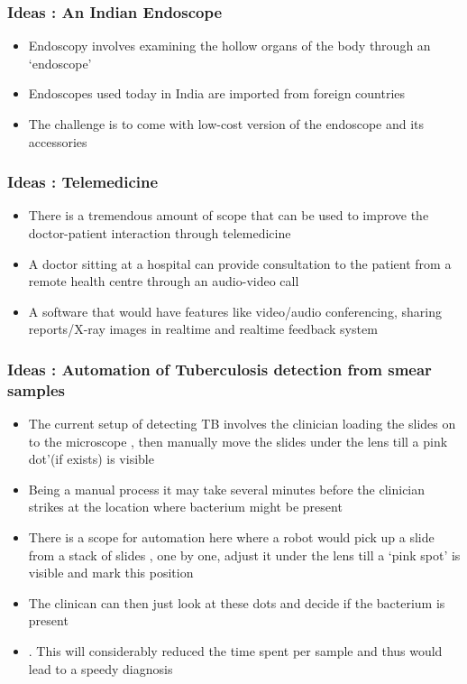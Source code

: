 \documentclass{beamer}
\begin{document}
\begin{frame}
\frametitle{Ideas : An  Indian Endoscope}
    \begin{itemize}
        \item  Endoscopy involves examining the hollow organs of the body through an ‘endoscope’
        \item  Endoscopes used today in India are imported from foreign countries
        \item  The challenge is to come with low-cost version of the endoscope and its accessories
    \end{itemize}
\end{frame}





\begin{frame}
\frametitle{Ideas : Telemedicine}
    \begin{itemize}
        \item  There is a tremendous amount of scope that can be used to improve the doctor-patient interaction through telemedicine
        \item  A doctor sitting at a hospital can provide consultation to the patient from a remote health centre through an audio-video call
        \item  A software that would have features like video/audio conferencing, sharing reports/X-ray images in realtime and realtime feedback system 
    \end{itemize}
\end{frame}



\begin{frame}
\frametitle{Ideas : Automation of Tuberculosis detection from smear samples}
    \begin{itemize}
        \item  The current setup of detecting TB involves the clinician loading the slides on to the microscope , then manually move the slides under the lens till a 
pink dot’(if exists) is visible
        \item   Being a manual process it may take several minutes before the clinician strikes at the location where bacterium might be present
        \item  There is a scope for automation here where a robot would pick up a slide from a stack of slides , one by one, adjust it under the lens till a ‘pink spot’ is visible and mark this position 
        \item The clinican can then just look at these dots and decide if the bacterium is present
        \item . This will considerably reduced the time spent per sample and thus would lead to a speedy diagnosis
    \end{itemize}
\end{frame}
\end{document}
